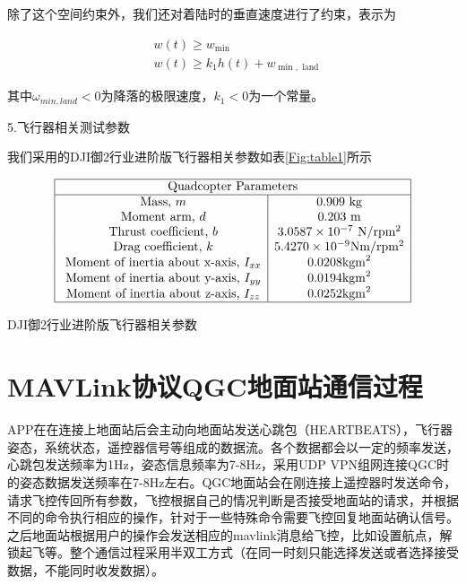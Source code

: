 除了这个空间约束外，我们还对着陆时的垂直速度进行了约束，表示为

\begin{equation}
\begin{aligned}
&w(t) \geq w_{\min } \\
&w(t) \geq k_{1} h(t)+w_{\min , \text { land }}
\end{aligned}
\end{equation}

其中$\omega_{min,land}<0$为降落的极限速度，$k_{1}<0$为一个常量。

5.飞行器相关测试参数

我们采用的DJI御2行业进阶版飞行器相关参数如表\ref{Fig:table1}所示

\begin{table}[ht]
  \centering
  $$
  \begin{array}{|c|c|}
    \hline \multicolumn{2}{|c|}{\text { Quadcopter Parameters }} \\
    \hline \text { Mass, } m & 0.909 \mathrm{~kg} \\
    \text { Moment arm, } d & 0.203 \mathrm{~m} \\
    \text { Thrust coefficient, } b & 3.0587 \times 10^{-7} \mathrm{~N} / \mathrm{rpm}^{2} \\
    \text { Drag coefficient, } k & 5.4270 \times 10^{-9} \mathrm{Nm} / \mathrm{rpm}^{2} \\
    \text { Moment of inertia about x-axis, } I_{x x} & 0.0208 \mathrm{kgm}^{2} \\
    \text { Moment of inertia about y-axis, } I_{y y} & 0.0194 \mathrm{kgm}^{2} \\
    \text { Moment of inertia about z-axis, } I_{z z} & 0.0252 \mathrm{kgm}^{2} \\
    \hline
  \end{array}
  $$
  \caption{DJI御2行业进阶版飞行器相关参数}\label{Fig:table1}
\end{table}

\section{MAVLink协议QGC地面站通信过程}

APP在在连接上地面站后会主动向地面站发送心跳包（HEARTBEATS），飞行器姿态，系统状态，遥控器信号等组成的数据流。各个数据都会以一定的频率发送，心跳包发送频率为1Hz，姿态信息频率为7-8Hz，采用UDP VPN组网连接QGC时的姿态数据发送频率在7-8Hz左右。QGC地面站会在刚连接上遥控器时发送命令，请求飞控传回所有参数，飞控根据自己的情况判断是否接受地面站的请求，并根据不同的命令执行相应的操作，针对于一些特殊命令需要飞控回复地面站确认信号。之后地面站根据用户的操作会发送相应的mavlink消息给飞控，比如设置航点，解锁起飞等。整个通信过程采用半双工方式（在同一时刻只能选择发送或者选择接受数据，不能同时收发数据）\cite{ArtE5}。


